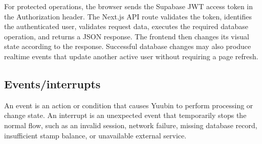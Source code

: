 ﻿\documentclass[12pt,a4paper]{report}
\begin{document}
For protected operations, the browser sends the Supabase JWT access token in the Authorization header. The Next.js API route validates the token, identifies the authenticated user, validates request data, executes the required database operation, and returns a JSON response. The frontend then changes its visual state according to the response. Successful database changes may also produce realtime events that update another active user without requiring a page refresh.

\subsection{Events/interrupts}

An event is an action or condition that causes Yuubin to perform processing or change state. An interrupt is an unexpected event that temporarily stops the normal flow, such as an invalid session, network failure, missing database record, insufficient stamp balance, or unavailable external service.
\end{document}

